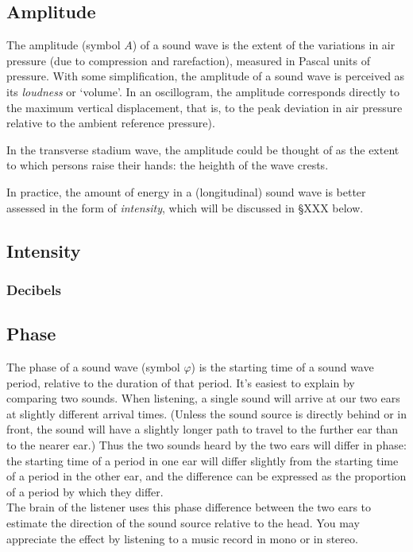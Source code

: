 \documentclass[
]{book}
\begin{document}
\subsection{Amplitude}\label{sec:amplitude}

The amplitude (symbol \(A\)) of a sound wave is the extent of the variations in air pressure (due to compression and rarefaction), measured in Pascal units of pressure. With some simplification, the amplitude of a sound wave is perceived as its \emph{loudness} or `volume'. In an oscillogram, the amplitude corresponds directly to the maximum vertical displacement, that is, to the peak deviation in air pressure relative to the ambient reference pressure).

In the transverse stadium wave, the amplitude could be thought of as the extent to which persons raise their hands: the heighth of the wave crests.

In practice, the amount of energy in a (longitudinal) sound wave is better assessed in the form of \emph{intensity}, which will be discussed in §XXX below.

\subsection{Intensity}\label{intensity}

\subsubsection{Decibels}\label{decibels}

\subsection{Phase}\label{sec:phase}

The phase of a sound wave (symbol \(\varphi\)) is the starting time of a sound wave period, relative to the duration of that period. It's easiest to explain by comparing two sounds. When listening, a single sound will arrive at our two ears at slightly different arrival times. (Unless the sound source is directly behind or in front, the sound will have a slightly longer path to travel to the further ear than to the nearer ear.) Thus the two sounds heard by the two ears will differ in phase: the starting time of a period in one ear will differ slightly from the starting time of a period in the other ear, and the difference can be expressed as the proportion of a period by which they differ.\\
The brain of the listener uses this phase difference between the two ears to estimate the direction of the sound source relative to the head. You may appreciate the effect by listening to a music record in mono or in stereo.
\end{document}
